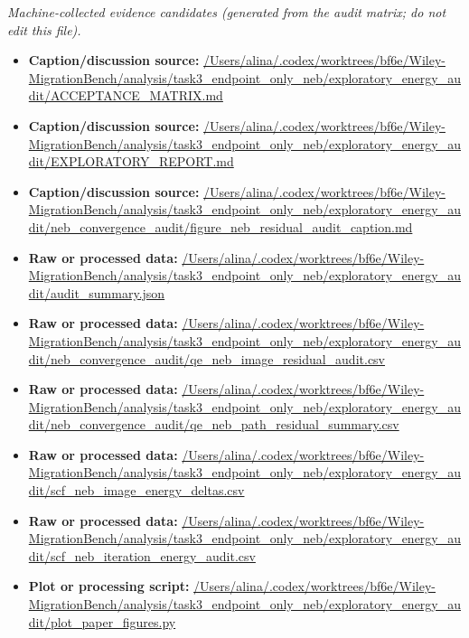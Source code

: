 \emph{Machine-collected evidence candidates (generated from the audit matrix; do not edit this file).}
\begin{itemize}[leftmargin=1.4em,noitemsep]
\item \textbf{Caption/discussion source:} \url{/Users/alina/.codex/worktrees/bf6e/Wiley-MigrationBench/analysis/task3_endpoint_only_neb/exploratory_energy_audit/ACCEPTANCE_MATRIX.md}
\item \textbf{Caption/discussion source:} \url{/Users/alina/.codex/worktrees/bf6e/Wiley-MigrationBench/analysis/task3_endpoint_only_neb/exploratory_energy_audit/EXPLORATORY_REPORT.md}
\item \textbf{Caption/discussion source:} \url{/Users/alina/.codex/worktrees/bf6e/Wiley-MigrationBench/analysis/task3_endpoint_only_neb/exploratory_energy_audit/neb_convergence_audit/figure_neb_residual_audit_caption.md}
\item \textbf{Raw or processed data:} \url{/Users/alina/.codex/worktrees/bf6e/Wiley-MigrationBench/analysis/task3_endpoint_only_neb/exploratory_energy_audit/audit_summary.json}
\item \textbf{Raw or processed data:} \url{/Users/alina/.codex/worktrees/bf6e/Wiley-MigrationBench/analysis/task3_endpoint_only_neb/exploratory_energy_audit/neb_convergence_audit/qe_neb_image_residual_audit.csv}
\item \textbf{Raw or processed data:} \url{/Users/alina/.codex/worktrees/bf6e/Wiley-MigrationBench/analysis/task3_endpoint_only_neb/exploratory_energy_audit/neb_convergence_audit/qe_neb_path_residual_summary.csv}
\item \textbf{Raw or processed data:} \url{/Users/alina/.codex/worktrees/bf6e/Wiley-MigrationBench/analysis/task3_endpoint_only_neb/exploratory_energy_audit/scf_neb_image_energy_deltas.csv}
\item \textbf{Raw or processed data:} \url{/Users/alina/.codex/worktrees/bf6e/Wiley-MigrationBench/analysis/task3_endpoint_only_neb/exploratory_energy_audit/scf_neb_iteration_energy_audit.csv}
\item \textbf{Plot or processing script:} \url{/Users/alina/.codex/worktrees/bf6e/Wiley-MigrationBench/analysis/task3_endpoint_only_neb/exploratory_energy_audit/plot_paper_figures.py}
\end{itemize}
